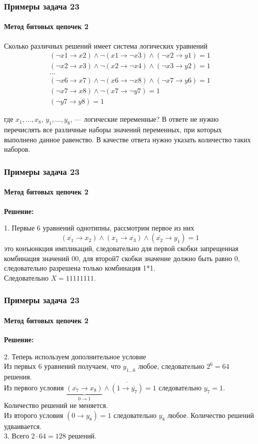 \begin{frame}[t]
\frametitle{Примеры задача 23}
\framesubtitle{Метод битовых цепочек 2}
Сколько различных решений имеет система логических уравнений 
\begin{align*}
(\neg x1 \rightarrow x2) \wedge \neg (x1 \rightarrow \neg x3) \wedge (\neg x2 \rightarrow y1) = 1\\
(\neg x2 \rightarrow x3) \wedge \neg (x2 \rightarrow \neg x4) \wedge (\neg x3 \rightarrow y2) = 1\\
\ldots\\
(\neg x6 \rightarrow x7) \wedge \neg (x6 \rightarrow \neg x8) \wedge (\neg x7 \rightarrow y6) = 1\\
(\neg x7 \rightarrow x8) \wedge \neg(x7 \rightarrow \neg y7) = 1\\
(\neg y7 \rightarrow y8) = 1
\end{align*}	


где $x_1, \ldots, x_{8}$, $y_1, \ldots, y_{8}$, --- логические переменные? В ответе не нужно перечислять все различные наборы значений переменных, при которых выполнено данное равенство. В качестве ответа нужно указать количество таких наборов.

	
\end{frame}

\begin{frame}[t]
\frametitle{Примеры задача 23}
\framesubtitle{Метод битовых цепочек 2}

\textbf{Решение: }
	
1. 
Первые 6 уравнений однотипны, рассмотрим первое из них
$$
(\overline{x_1} \rightarrow x_2) \wedge \overline{(x_1 \rightarrow \overline{x_3})} \wedge (\overline{x_2} \rightarrow y_1) = 1
$$
это конъюнкция импликаций, следовательно для первой скобки запрещенная комбинация значений 00, для второй7 скобки значение должно быть равно 0, следовательно разрешена только комбинация 1*1. \\
Следовательно $X=11111111$.



\end{frame}

\begin{frame}[t]
\frametitle{Примеры задача 23}
\framesubtitle{Метод битовых цепочек 2}

\textbf{Решение: }

2. Теперь используем дополнительное условие\\
Из первых 6 уравнений получаем, что $y_{1\ldots 6}$ любое, следовательно $2^6=64$ решения.\\
 	\pause 
Из первого условия 
$\underbrace{(\overline{x_7} \rightarrow x_8)}_{0 \rightarrow 1} \wedge \overline{(1 \rightarrow \overline{y_7})} = 1$ следовательно $y_7=1$. Количество решений не меняется.\\

Из второго условия 
$(0 \rightarrow y_8) = 1$ следовательно $y_8$ любое. Количество решений удваивается.\\

3. Всего $2\cdot 64=128$ решений.

\end{frame}


